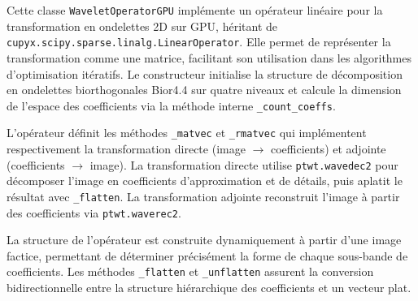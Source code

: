 
Cette classe \texttt{WaveletOperatorGPU} implémente un opérateur linéaire pour la transformation en ondelettes 2D sur GPU, héritant de \texttt{cupyx.scipy.sparse.linalg.LinearOperator}. Elle permet de représenter la transformation comme une matrice, facilitant son utilisation dans les algorithmes d'optimisation itératifs. Le constructeur initialise la structure de décomposition en ondelettes biorthogonales Bior4.4 sur quatre niveaux et calcule la dimension de l'espace des coefficients via la méthode interne \texttt{\_count\_coeffs}.

L'opérateur définit les méthodes \texttt{\_matvec} et \texttt{\_rmatvec} qui implémentent respectivement la transformation directe (image $\rightarrow$ coefficients) et adjointe (coefficients $\rightarrow$ image). La transformation directe utilise \texttt{ptwt.wavedec2} pour décomposer l'image en coefficients d'approximation et de détails, puis aplatit le résultat avec \texttt{\_flatten}. La transformation adjointe reconstruit l'image à partir des coefficients via \texttt{ptwt.waverec2}.

La structure de l'opérateur est construite dynamiquement à partir d'une image factice, permettant de déterminer précisément la forme de chaque sous-bande de coefficients. Les méthodes \texttt{\_flatten} et \texttt{\_unflatten} assurent la conversion bidirectionnelle entre la structure hiérarchique des coefficients et un vecteur plat.

